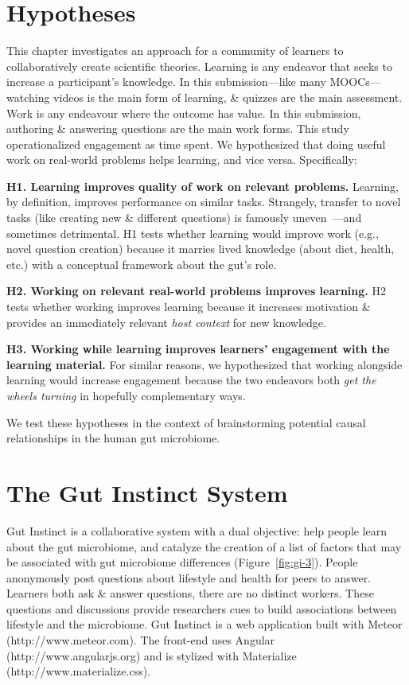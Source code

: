 \section{Hypotheses}
This chapter investigates an approach for a community of learners to collaboratively create scientific theories. Learning is any endeavor that seeks to increase a participant’s knowledge. In this submission---like many MOOCs---watching videos is the main form of learning, \& quizzes are the main assessment. Work is any endeavour where the outcome has value. In this submission, authoring \& answering questions are the main work forms. This study operationalized engagement as time spent. We hypothesized that doing useful work on real-world problems helps learning, and vice versa. Specifically:

\textbf{H1. Learning improves quality of work on relevant problems.}
Learning, by definition, improves performance on similar tasks. Strangely, transfer to novel tasks (like creating new \& different questions) is famously uneven~\cite{Boden2004}---and sometimes detrimental. H1 tests whether learning would improve work (e.g., novel question creation) because it marries lived knowledge (about diet, health, etc.) with a conceptual framework about the gut’s role.

\textbf{H2. Working on relevant real-world problems improves learning.}
H2 tests whether working improves learning because it increases motivation \& provides an immediately relevant \textit{host context} for new knowledge.
 
\textbf{H3. Working while learning improves learners’ engagement with the learning material.} 
For similar reasons, we hypothesized that working alongside learning would increase engagement because the two endeavors both \textit{get the wheels turning} in hopefully complementary ways.

We test these hypotheses in the context of brainstorming potential causal relationships in the human gut microbiome. 

\section{The Gut Instinct System}
Gut Instinct is a collaborative system with a dual objective: help people learn about the gut microbiome, and catalyze the creation of a list of factors that may be associated with gut microbiome differences (Figure~\ref{fig:gi-3}). People anonymously post questions about lifestyle and health for peers to answer. Learners both ask \& answer questions, there are
no distinct workers. These questions and discussions provide researchers cues to build associations between lifestyle and the microbiome.
Gut Instinct is a web application built with Meteor (http://www.meteor.com). The front-end uses Angular (http://www.angularjs.org) and is stylized with Materialize (http://www.materialize.css).

